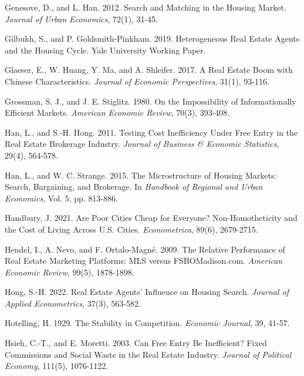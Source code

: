 \documentclass[11pt]{article}
\begin{document}
\begin{singlespace}
\begin{thebibliography}{}
Genesove, D., and L. Han. 2012. Search and Matching in the Housing Market. \textit{Journal of Urban Economics}, 72(1), 31-45. 

Gilbukh, S., and P. Goldsmith-Pinkham. 2019. Heterogeneous Real Estate Agents and the Housing Cycle. Yale University Working Paper.

Glaeser, E., W. Huang, Y. Ma, and A. Shleifer. 2017. A Real Estate Boom with Chinese Characteristics. \textit{Journal of Economic Perspectives}, 31(1), 93-116. 

Grossman, S. J., and J. E. Stiglitz. 1980. On the Impossibility of Informationally Efficient Markets. \textit{American Economic Review}, 70(3), 393-408. 

Han, L., and S.-H. Hong. 2011. Testing Cost Inefficiency Under Free Entry in the Real Estate Brokerage Industry. \textit{Journal of Business \& Economic Statistics}, 29(4), 564-578. 

Han, L., and W. C. Strange. 2015. The Microstructure of Housing Markets: Search, Bargaining, and Brokerage. In \textit{Handbook of Regional and Urban Economics}, Vol. 5, pp. 813-886. 

Handbury, J. 2021. Are Poor Cities Cheap for Everyone? Non-Homotheticity and the Cost of Living Across U.S. Cities. \textit{Econometrica}, 89(6), 2679-2715. 

Hendel, I., A. Nevo, and F. Ortalo-Magné. 2009. The Relative Performance of Real Estate Marketing Platforms: MLS versus FSBOMadison.com. \textit{American Economic Review}, 99(5), 1878-1898. 

Hong, S.-H. 2022. Real Estate Agents' Influence on Housing Search. \textit{Journal of Applied Econometrics}, 37(3), 563-582. 

Hotelling, H. 1929. The Stability in Competition. \textit{Economic Journal}, 39, 41-57. 

Hsieh, C.-T., and E. Moretti. 2003. Can Free Entry Be Inefficient? Fixed Commissions and Social Waste in the Real Estate Industry. \textit{Journal of Political Economy}, 111(5), 1076-1122. 


\end{thebibliography}
\end{singlespace}
\end{document}

